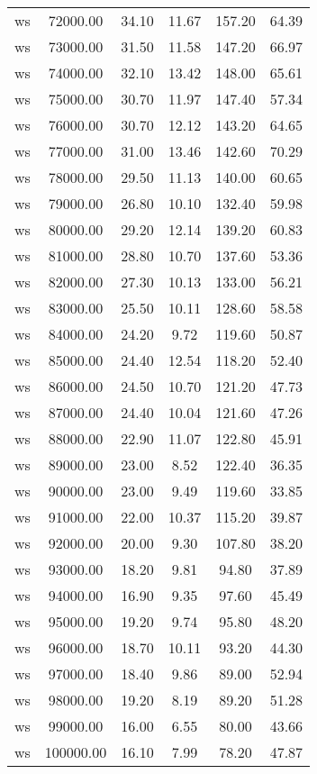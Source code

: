 \begin{table}[ht]
\begin{table}[ht]
\begin{tabular}{|cccccc}
  ws & 72000.00 & 34.10 & 11.67 & 157.20 & 64.39 \\ 
  ws & 73000.00 & 31.50 & 11.58 & 147.20 & 66.97 \\ 
  ws & 74000.00 & 32.10 & 13.42 & 148.00 & 65.61 \\ 
  ws & 75000.00 & 30.70 & 11.97 & 147.40 & 57.34 \\ 
  ws & 76000.00 & 30.70 & 12.12 & 143.20 & 64.65 \\ 
  ws & 77000.00 & 31.00 & 13.46 & 142.60 & 70.29 \\ 
  ws & 78000.00 & 29.50 & 11.13 & 140.00 & 60.65 \\ 
  ws & 79000.00 & 26.80 & 10.10 & 132.40 & 59.98 \\ 
  ws & 80000.00 & 29.20 & 12.14 & 139.20 & 60.83 \\ 
  ws & 81000.00 & 28.80 & 10.70 & 137.60 & 53.36 \\ 
  ws & 82000.00 & 27.30 & 10.13 & 133.00 & 56.21 \\ 
  ws & 83000.00 & 25.50 & 10.11 & 128.60 & 58.58 \\ 
  ws & 84000.00 & 24.20 & 9.72 & 119.60 & 50.87 \\ 
  ws & 85000.00 & 24.40 & 12.54 & 118.20 & 52.40 \\ 
  ws & 86000.00 & 24.50 & 10.70 & 121.20 & 47.73 \\ 
  ws & 87000.00 & 24.40 & 10.04 & 121.60 & 47.26 \\ 
  ws & 88000.00 & 22.90 & 11.07 & 122.80 & 45.91 \\ 
  ws & 89000.00 & 23.00 & 8.52 & 122.40 & 36.35 \\ 
  ws & 90000.00 & 23.00 & 9.49 & 119.60 & 33.85 \\ 
  ws & 91000.00 & 22.00 & 10.37 & 115.20 & 39.87 \\ 
  ws & 92000.00 & 20.00 & 9.30 & 107.80 & 38.20 \\ 
  ws & 93000.00 & 18.20 & 9.81 & 94.80 & 37.89 \\ 
  ws & 94000.00 & 16.90 & 9.35 & 97.60 & 45.49 \\ 
  ws & 95000.00 & 19.20 & 9.74 & 95.80 & 48.20 \\ 
  ws & 96000.00 & 18.70 & 10.11 & 93.20 & 44.30 \\ 
  ws & 97000.00 & 18.40 & 9.86 & 89.00 & 52.94 \\ 
  ws & 98000.00 & 19.20 & 8.19 & 89.20 & 51.28 \\ 
  ws & 99000.00 & 16.00 & 6.55 & 80.00 & 43.66 \\ 
  ws & 100000.00 & 16.10 & 7.99 & 78.20 & 47.87 \\ 

\end{tabular}
\end{table}
\end{table}
